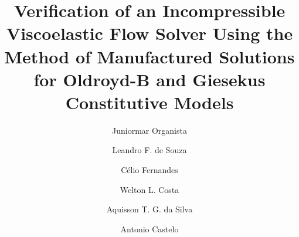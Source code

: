 \documentclass[preprint, 12pt]{elsarticle}
\begin{document}
\begin{frontmatter}



\title{Verification of an Incompressible Viscoelastic Flow Solver Using the Method of Manufactured Solutions for Oldroyd-B and Giesekus Constitutive Models}


\author[1]{Juniormar Organista}
\author[1]{Leandro F. de Souza}
\author[2,3]{Célio Fernandes}
\author[1]{Welton L. Costa}
\author[1]{Aquisson T. G. da Silva}
\author[1]{Antonio Castelo}


\end{frontmatter}
\end{document}
